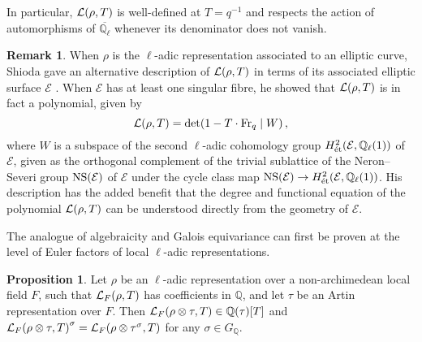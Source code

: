 \documentclass{article}
\theoremstyle{definition}
\newtheorem{proposition}[n]{Proposition}
\theoremstyle{definition}
\newtheorem{remark}[n]{Remark}
\newcommand{\EEE}{\mathcal{E}}
\newcommand{\et}{\text{\'et}}
\newcommand{\Fr}{\mathrm{Fr}}
\newcommand{\LLL}{\mathcal{L}}
\newcommand{\NS}{\mathrm{NS}}
\newcommand{\QQ}{\mathbb{Q}}
\newcommand{\st}{\mid}
\newcommand{\br}{\!\del[0]}
\begin{document}
In particular, $ \LLL\br{\rho, T} $ is well-defined at $ T = q^{-1} $ and respects the action of automorphisms of $ \overline{\QQ_\ell} $ whenever its denominator does not vanish.

\begin{remark}
When $ \rho $ is the $ \ell $-adic representation associated to an elliptic curve, Shioda gave an alternative description of $ \LLL\br{\rho, T} $ in terms of its associated elliptic surface $ \EEE $ \cite[Theorem 4]{Shi92}. When $ \EEE $ has at least one singular fibre, he showed that $ \LLL\br{\rho, T} $ is in fact a polynomial, given by
$$ \LLL\br{\rho, T} = \det\br{1 - T \cdot \Fr_q \st W}, $$
where $ W $ is a subspace of the second $ \ell $-adic cohomology group $ H_\et^2\br{\EEE, \QQ_\ell\br{1}} $ of $ \EEE $, given as the orthogonal complement of the trivial sublattice of the Neron--Severi group $ \NS\br{\EEE} $ of $ \EEE $ under the cycle class map $ \NS\br{\EEE} \to H_\et^2\br{\EEE, \QQ_\ell\br{1}} $. His description has the added benefit that the degree and functional equation of the polynomial $ \LLL\br{\rho, T} $ can be understood directly from the geometry of $ \EEE $.
\end{remark}

The analogue of algebraicity and Galois equivariance can first be proven at the level of Euler factors of local $ \ell $-adic representations.

\pagebreak

\begin{proposition}
\label{prop:local}
Let $ \rho $ be an $ \ell $-adic representation over a non-archimedean local field $ F $, such that $ \LLL_F\br{\rho, T} $ has coefficients in $ \QQ $, and let $ \tau $ be an Artin representation over $ F $. Then $ \LLL_F\br{\rho \otimes \tau, T} \in \QQ\br{\tau}\sbr{T} $ and $ \LLL_F\br{\rho \otimes \tau, T}^\sigma = \LLL_F\br{\rho \otimes \tau^\sigma, T} $ for any $ \sigma \in G_\QQ $.
\end{proposition}
\end{document}
